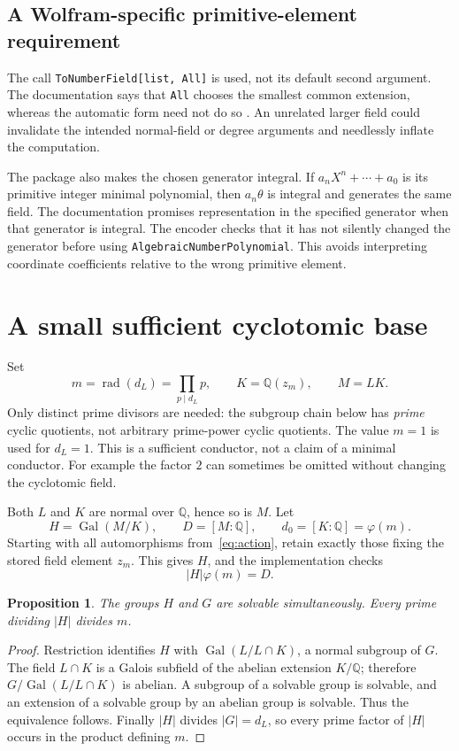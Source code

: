 \documentclass[11pt,a4paper]{article}
\newcommand{\Q}{\mathbb Q}
\newcommand{\Gal}{\operatorname{Gal}}
\newcommand{\rad}{\operatorname{rad}}
\newcommand{\code}[1]{\texttt{\small #1}}
\newtheorem{proposition}[theorem]{Proposition}
\theoremstyle{definition}
\begin{document}
\subsection{A Wolfram-specific primitive-element requirement}
The call \code{ToNumberField[list, All]} is used, not its default second
argument. The documentation says that \code{All} chooses the smallest common
extension, whereas the automatic form need not do so \cite{tonumberfield}.
An unrelated larger field could invalidate the intended normal-field or degree
arguments and needlessly inflate the computation.

The package also makes the chosen generator integral. If
$a_nX^n+\cdots+a_0$ is its primitive integer minimal polynomial, then
$a_n\theta$ is integral and generates the same field. The documentation promises
representation in the specified generator when that generator is integral.
The encoder checks that it has not silently changed the generator before using
\code{AlgebraicNumberPolynomial}. This avoids interpreting coordinate
coefficients relative to the wrong primitive element.

\section{A small sufficient cyclotomic base}\label{sec:cyclotomic}
Set
\begin{equation}\label{eq:fields}
 m=\rad(d_L)=\prod_{p\mid d_L}p,\qquad
 K=\Q(z_m),\qquad M=LK.
\end{equation}
Only distinct prime divisors are needed: the subgroup chain below has
\emph{prime} cyclic quotients, not arbitrary prime-power cyclic quotients.
The value $m=1$ is used for $d_L=1$. This is a sufficient conductor, not a claim
of a minimal conductor. For example the factor $2$ can sometimes be omitted
without changing the cyclotomic field.

Both $L$ and $K$ are normal over $\Q$, hence so is $M$. Let
\[
 H=\Gal(M/K),\qquad D=[M:\Q],\qquad d_0=[K:\Q]=\varphi(m).
\]
Starting with all automorphisms from~\eqref{eq:action}, retain exactly those
fixing the stored field element $z_m$. This gives $H$, and the implementation
checks
\begin{equation}\label{eq:stabilizer}
 |H|\varphi(m)=D.
\end{equation}

\begin{proposition}\label{prop:relative}
The groups $H$ and $G$ are solvable simultaneously. Every prime dividing $|H|$
divides $m$.
\end{proposition}
\begin{proof}
Restriction identifies $H$ with $\Gal(L/L\cap K)$, a normal subgroup of $G$.
The field $L\cap K$ is a Galois subfield of the abelian extension $K/\Q$;
therefore $G/\Gal(L/L\cap K)$ is abelian. A subgroup of a solvable group is
solvable, and an extension of a solvable group by an abelian group is solvable.
Thus the equivalence follows. Finally $|H|$ divides $|G|=d_L$, so every prime
factor of $|H|$ occurs in the product defining $m$.
\end{proof}
\end{document}
